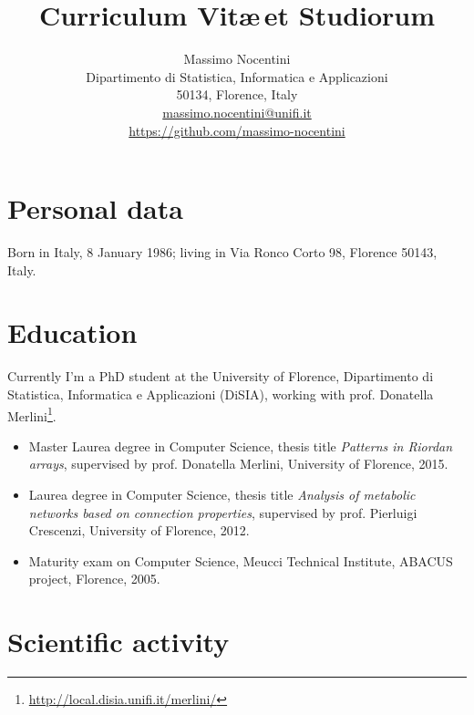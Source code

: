 \documentclass[10pt,a4paper]{scrartcl}
\begin{document}
    \title{Curriculum Vit\ae\,et Studiorum}

    \author{Massimo Nocentini\\ 
        \small{Dipartimento di Statistica, Informatica e Applicazioni}\\
        \small{50134, Florence, Italy}\\
        \small{\url{massimo.nocentini@unifi.it}}\\
        \small{\url{https://github.com/massimo-nocentini}}\\
        }

    \maketitle

    \section{Personal data}
    
    Born in Italy, 8 January 1986; living in Via Ronco Corto 98, Florence 50143, Italy. 

    \section{Education}

    Currently I'm a PhD student at the University of Florence, 
    Dipartimento di Statistica, Informatica e Applicazioni (DiSIA), working
    with prof. Donatella Merlini\footnote{\url{http://local.disia.unifi.it/merlini/}}.

    \begin{itemize}
        \item Master Laurea degree in Computer Science, thesis title \emph{Patterns in Riordan arrays}, 
            supervised by prof. Donatella Merlini, University of Florence, 2015.
        \item Laurea degree in Computer Science, thesis title \emph{Analysis of metabolic networks based on connection properties}, 
            supervised by prof. Pierluigi Crescenzi, University of Florence, 2012.
        \item Maturity exam on Computer Science, Meucci Technical Institute, ABACUS project, Florence, 2005.
    \end{itemize}

    \section{Scientific activity}
    
\end{document}
